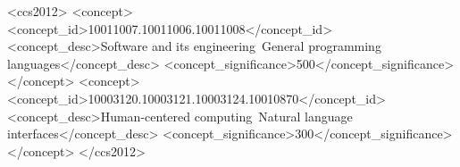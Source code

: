\documentclass[10pt, sigplan, preprint]{acmart}
\begin{document}
%

 \begin{CCSXML}
<ccs2012>
<concept>
<concept_id>10011007.10011006.10011008</concept_id>
<concept_desc>Software and its engineering~General programming languages</concept_desc>
<concept_significance>500</concept_significance>
</concept>
<concept>
<concept_id>10003120.10003121.10003124.10010870</concept_id>
<concept_desc>Human-centered computing~Natural language interfaces</concept_desc>
<concept_significance>300</concept_significance>
</concept>
</ccs2012>
\end{CCSXML}





%


 
\end{document}
